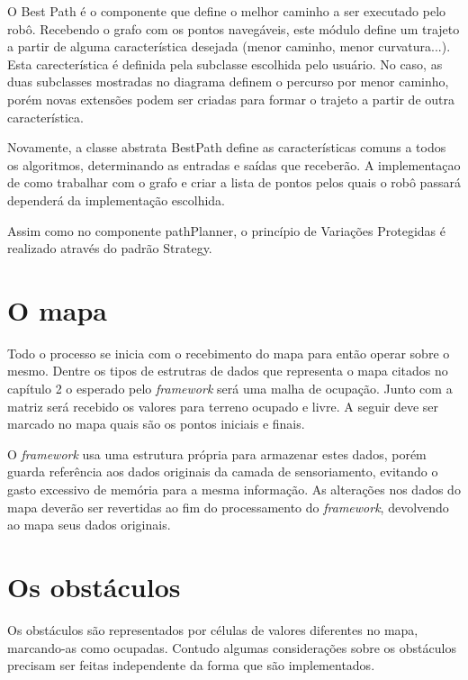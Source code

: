 O Best Path é o componente que define o melhor caminho a ser executado pelo robô. Recebendo o grafo com os pontos navegáveis, este módulo define um trajeto a partir de alguma característica desejada (menor caminho, menor curvatura...). Esta carecterística é definida pela subclasse escolhida pelo usuário. No caso, as duas subclasses mostradas no diagrama definem o percurso por menor caminho, porém novas extensões podem ser criadas para formar o trajeto a partir de outra característica.

Novamente, a classe abstrata BestPath define as características comuns a todos os algoritmos, determinando as entradas e saídas que receberão. A implementaçao de como trabalhar com o grafo e criar a lista de pontos pelos quais o robô passará dependerá da implementação escolhida.

Assim como no componente pathPlanner, o princípio de Variações Protegidas é realizado através do padrão Strategy.

\section{O mapa}

Todo o processo se inicia com o recebimento do mapa para então operar sobre o mesmo. Dentre os tipos de estrutras de dados que representa o mapa citados no capítulo 2 o esperado pelo \textit{framework} será uma malha de ocupação. Junto com a matriz será recebido os valores para terreno ocupado e livre. A seguir deve ser marcado no mapa quais são os pontos iniciais e finais.

O \textit{framework} usa uma estrutura própria para armazenar estes dados, porém guarda referência aos dados originais da camada de sensoriamento, evitando o gasto excessivo de memória para a mesma informação. As alterações nos dados do mapa deverão ser revertidas ao fim do processamento do \textit{framework}, devolvendo ao mapa seus dados originais.

\section{Os obstáculos}

Os obstáculos são representados por células de valores diferentes no mapa, marcando-as como ocupadas. Contudo algumas considerações sobre os obstáculos precisam ser feitas independente da forma que são implementados.

